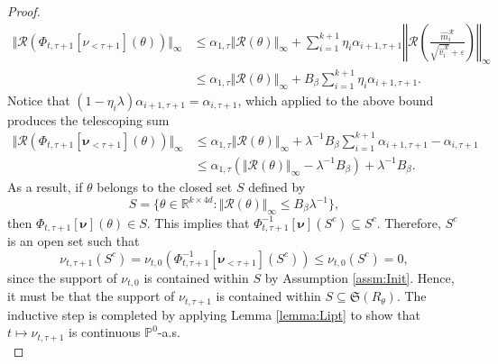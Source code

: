 \documentclass{article}
\newcommand{\R}{\mathbb{R}}
\begin{document}
\begin{appendices}
\begin{proof}
\begin{align*}
   \Vert \mathcal R( \Phi_{t,\tau+1}[\nu_{<\tau+1}](\theta))\Vert_\infty&\le \alpha_{1,\tau}\Vert \mathcal R(\theta)\Vert_\infty +\sum_{i=1}^{k+1} \eta_{i}\alpha_{i+1,\tau+1}\left\Vert \mathcal R\left( \frac{\hat m^\mathcal{R}_i}{\sqrt{\hat v^\mathcal R_i}+\varepsilon}\right)\right\Vert_\infty\\
   & \le\alpha_{1,\tau}\Vert \mathcal R(\theta)\Vert_\infty +B_\beta\sum_{i=1}^{k+1}\eta_{i}\alpha_{i+1,\tau+1}.
\end{align*}
Notice that $(1-\eta_i\lambda)\alpha_{i+1,\tau+1}=\alpha_{i,\tau+1}$, which applied to the above bound produces the telescoping sum 
\begin{align*}
   \Vert \mathcal R( \Phi_{t,\tau+1}[\bm\nu_{<\tau+1}](\theta))\Vert_\infty& \le \alpha_{1,\tau}\Vert \mathcal R(\theta)\Vert_\infty +\lambda^{-1}B_\beta\sum_{i=1}^{k+1} \alpha_{i+1,\tau+1}-\alpha_{i,\tau+1}\\
   & \le\alpha_{1,\tau}\left(\Vert \mathcal R(\theta)\Vert_\infty -\lambda^{-1}B_\beta\right)+\lambda^{-1}B_\beta.
\end{align*}
As a result, if $\theta$ belongs to the closed set $S$ defined by
\[
S=\{\theta \in \R^{k\times 4d}:\Vert \mathcal R(\theta)\Vert_\infty \le B_\beta\lambda^{-1}\},
\]
then $\Phi_{t,\tau+1}[\bm\nu](\theta)\in S$. This implies that $\Phi^{-1}_{t,\tau+1}[\bm\nu](S^c)\subseteq S^c$. Therefore, $S^c$ is an open set such that $$\nu_{t,\tau+1}(S^c)=\nu_{t,0}(\Phi^{-1}_{t,\tau+1}[\bm\nu_{<\tau+1}](S^c))\le \nu_{t,0}(S^c)=0, $$ since the support of $\nu_{t,0}$ is contained within $S$ by Assumption \ref{assm:Init}. Hence, it must be that the support of $\nu_{t,\tau+1}$ is contained within $S \subseteq\mathfrak{S}(R_\theta)$. The inductive step is completed by applying Lemma \ref{lemma:Lipt} to show that $t\mapsto \nu_{t,\tau+1}$ is continuous $\mathbb P^0$-a.s.\\


\end{proof}
\end{appendices}
\end{document}
